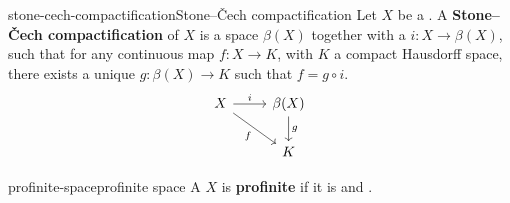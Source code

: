\begin{topic}{stone-cech-compactification}{Stone--Čech compactification}
    Let $X$ be a . A \textbf{Stone--Čech compactification} of $X$ is a   space $\beta(X)$ together with a  $i : X \to \beta(X)$, such that for any continuous map $f : X \to K$, with $K$ a compact Hausdorff space, there exists a unique $g : \beta(X) \to K$ such that $f = g \circ i$.
    \[ \begin{tikzcd} X \arrow{r}{i} \arrow[swap]{dr}{f} & \beta(X) \arrow{d}{g} \\ & K \end{tikzcd} \]
\end{topic}

\begin{topic}{profinite-space}{profinite space}
    A  $X$ is \textbf{profinite} if it is   and .
\end{topic}
